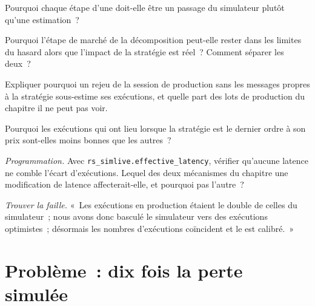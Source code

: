 \begin{exercise}[$\star$]\label{exo:rs:simulation-versus-live:3}
Pourquoi chaque étape d'une  doit-elle être un passage du simulateur plutôt qu'une estimation~?
\end{exercise}

\begin{exercise}[$\star\star$]\label{exo:rs:simulation-versus-live:4}
Pourquoi l'étape de marché de la décomposition peut-elle rester dans les limites du hasard alors que l'impact de la stratégie est réel~? Comment séparer les deux~?
\end{exercise}

\begin{exercise}[$\star\star$]\label{exo:rs:simulation-versus-live:5}
Expliquer pourquoi un rejeu de la session de production sans les messages propres à la stratégie sous-estime ses exécutions, et quelle part des lots de production du chapitre il ne peut pas voir.
\end{exercise}

\begin{exercise}[$\star\star$]\label{exo:rs:simulation-versus-live:6}
Pourquoi les exécutions qui ont lieu lorsque la stratégie est le dernier ordre à son prix sont-elles moins bonnes que les autres~?
\end{exercise}

\begin{exercise}[$\star\star\star$]\label{exo:rs:simulation-versus-live:7}
\emph{Programmation.} Avec \texttt{rs\_simlive.effective\_latency}, vérifier qu'aucune latence ne comble l'écart d'exécutions. Lequel des deux mécanismes du chapitre une modification de latence
affecterait-elle, et pourquoi pas l'autre~?
\end{exercise}

\begin{exercise}[$\star\star\star$]\label{exo:rs:simulation-versus-live:8}
\emph{Trouver la faille.} «~Les exécutions en production étaient le double de celles du simulateur~; nous avons donc basculé le simulateur vers des exécutions optimistes~; désormais les nombres d'exécutions coïncident et le  est
calibré.~»
\end{exercise}

\section{Problème~: dix fois la perte simulée}

